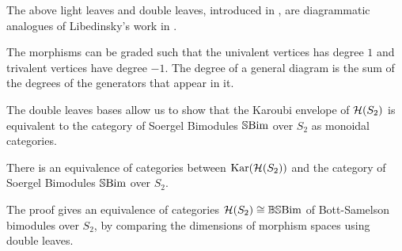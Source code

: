 \begin{remark}
    The above light leaves and double leaves, introduced in \cite{elias-williamson-soergel-calculus}, are diagrammatic analogues of Libedinsky's work in \cite{libedinsky-lightleavesbasis}.
\end{remark}

The morphisms can be graded such that the univalent vertices has degree $1$ and trivalent vertices have degree $-1$. The degree of a general diagram is the sum of the degrees of the generators that appear in it. 


The double leaves bases allow us to show that the Karoubi envelope of $\mathcal{H}(S_2)$ is equivalent to the category of Soergel Bimodules $\operatorname{\mathbb{S}Bim}$ over $S_2$ as monoidal categories.

\begin{theorem}
    There is an equivalence of categories between $\operatorname{Kar}(\mathcal{H}(S_2))$ and the category of Soergel Bimodules $\operatorname{\mathbb{S}Bim}$ over $S_2$.
\end{theorem}
The proof gives an equivalence of categories $\mathcal{H}(S_2) \cong \operatorname{\mathbb{BS}Bim}$ of Bott-Samelson bimodules over $S_2$, by comparing the dimensions of morphism spaces using double leaves.

